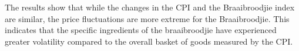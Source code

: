 \documentclass[11pt,preprint, authoryear]{elsarticle}
\numberwithin{equation}{section}
\numberwithin{figure}{section}
\numberwithin{table}{section}
\begin{document}
The results show that while the changes in the CPI and the Braaibroodjie
index are similar, the price fluctuations are more extreme for the
Braaibroodjie. This indicates that the specific ingredients of the
braaibroodjie have experienced greater volatility compared to the
overall basket of goods measured by the CPI.


\end{document}
